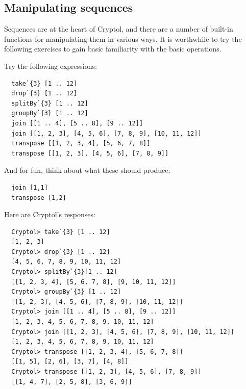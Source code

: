 \subsection{Manipulating sequences} 
\label{sec:manip-sequ}

Sequences are at the heart of Cryptol, and there are a number of
built-in functions for manipulating them in various ways.  It is
worthwhile to try the following exercises to gain basic familiarity
with the basic operations.

\begin{Exercise}\label{ex:seq:11}
Try the following expressions:\indTake\indDrop\indSplitBy\indGroup\indJoin\indTranspose
\begin{Verbatim}
  take`{3} [1 .. 12]
  drop`{3} [1 .. 12]
  splitBy`{3} [1 .. 12]
  groupBy`{3} [1 .. 12]
  join [[1 .. 4], [5 .. 8], [9 .. 12]]
  join [[1, 2, 3], [4, 5, 6], [7, 8, 9], [10, 11, 12]]
  transpose [[1, 2, 3, 4], [5, 6, 7, 8]]
  transpose [[1, 2, 3], [4, 5, 6], [7, 8, 9]]
\end{Verbatim}
And for fun, think about what these should produce:
\begin{Verbatim}
  join [1,1]
  transpose [1,2]
\end{Verbatim}
\end{Exercise}
\begin{Answer}
Here are Cryptol's responses:
\begin{Verbatim}
  Cryptol> take`{3} [1 .. 12]
  [1, 2, 3]
  Cryptol> drop`{3} [1 .. 12]
  [4, 5, 6, 7, 8, 9, 10, 11, 12]
  Cryptol> splitBy`{3}[1 .. 12]
  [[1, 2, 3, 4], [5, 6, 7, 8], [9, 10, 11, 12]]
  Cryptol> groupBy`{3} [1 .. 12]
  [[1, 2, 3], [4, 5, 6], [7, 8, 9], [10, 11, 12]]
  Cryptol> join [[1 .. 4], [5 .. 8], [9 .. 12]]
  [1, 2, 3, 4, 5, 6, 7, 8, 9, 10, 11, 12]
  Cryptol> join [[1, 2, 3], [4, 5, 6], [7, 8, 9], [10, 11, 12]]
  [1, 2, 3, 4, 5, 6, 7, 8, 9, 10, 11, 12]
  Cryptol> transpose [[1, 2, 3, 4], [5, 6, 7, 8]]
  [[1, 5], [2, 6], [3, 7], [4, 8]]
  Cryptol> transpose [[1, 2, 3], [4, 5, 6], [7, 8, 9]]
  [[1, 4, 7], [2, 5, 8], [3, 6, 9]]
\end{Verbatim}
\end{Answer}

